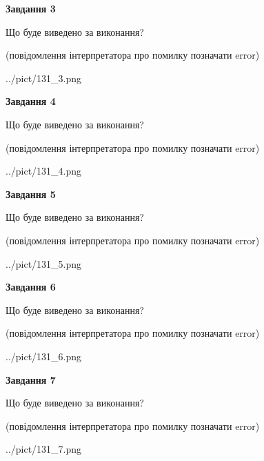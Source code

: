 \documentclass[12pt, ukrainian]{article}
\begin{document}
{\begin {large}
{\begin {center}\textbf{Завдання 3}\end {center}}\par
Що буде виведено за виконання?\par
 (повідомлення інтерпретатора про помилку позначати error)\par
\begin{center}
	{../pict/131_3.png}
\end{center}
\newpage

{\begin {center}\textbf{Завдання 4}\end {center}}\par
Що буде виведено за виконання?\par
 (повідомлення інтерпретатора про помилку позначати error)\par
\begin{center}
	{../pict/131_4.png}
\end{center}
\newpage

{\begin {center}\textbf{Завдання 5}\end {center}}\par
Що буде виведено за виконання?\par
 (повідомлення інтерпретатора про помилку позначати error)\par
\begin{center}
	{../pict/131_5.png}
\end{center}
\newpage

{\begin {center}\textbf{Завдання 6}\end {center}}\par
Що буде виведено за виконання?\par
 (повідомлення інтерпретатора про помилку позначати error)\par
\begin{center}
	{../pict/131_6.png}
\end{center}
\newpage

{\begin {center}\textbf{Завдання 7}\end {center}}\par
Що буде виведено за виконання?\par
 (повідомлення інтерпретатора про помилку позначати error)\par
\begin{center}
	{../pict/131_7.png}
\end{center}
\newpage


\end{large}}
\end{document}
